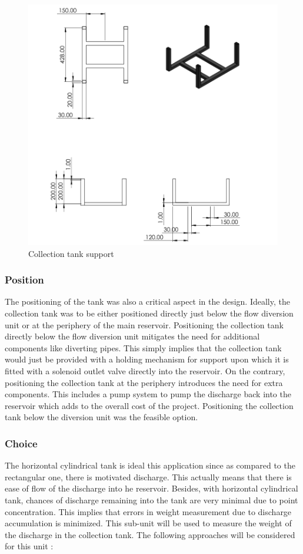 \begin{figure}[H]
\includegraphics[width=0.9\linewidth]{Figures/Collection tank support.png}
\centering
\caption{Collection tank support }
\label{fig:Collection tank support}
\end{figure}

\subsubsection{Position}
\par
The positioning of the tank was also a critical aspect in the design. Ideally, the collection tank was to be either positioned directly just below the flow diversion unit or at the periphery of the main reservoir. Positioning the collection tank directly below the flow diversion unit mitigates the need for additional components like diverting pipes. This simply implies that the collection tank would just be provided with a holding mechanism for support upon which it is fitted with a solenoid outlet valve directly into the reservoir. On the contrary, positioning the collection tank at the periphery introduces the need for extra components. This includes a pump system to pump the discharge back into the reservoir which adds to the overall cost of the project. Positioning the collection tank below the diversion unit was the feasible option.
\par


\subsubsection{Choice}
\par
The horizontal cylindrical tank is ideal this application since as compared to the rectangular one, there is motivated discharge. This actually means that there is ease of flow of the discharge into he reservoir. Besides, with horizontal cylindrical tank, chances of discharge remaining into the tank are very minimal due to point concentration. This implies that errors in weight measurement due to discharge accumulation is minimized.
This sub-unit will be used to measure the weight of the discharge in the collection tank. The following approaches will be considered for this unit :

